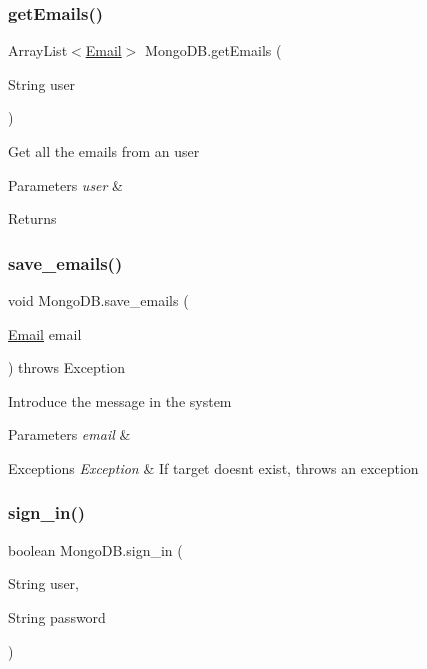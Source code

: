 \subsubsection{\texorpdfstring{get\+Emails()}{getEmails()}}
{\footnotesize\ttfamily Array\+List$<$\hyperlink{class_email}{Email}$>$ Mongo\+D\+B.\+get\+Emails (\begin{DoxyParamCaption}\item[{String}]{user }\end{DoxyParamCaption})}

Get all the emails from an user 
\begin{DoxyParams}{Parameters}
{\em user} & \\
\hline
\end{DoxyParams}
\begin{DoxyReturn}{Returns}

\end{DoxyReturn}
\mbox{\label{class_mongo_d_b_a2e376b333a71c82b5dd8e054d538e7f4}} 
\subsubsection{\texorpdfstring{save\+\_\+emails()}{save\_emails()}}
{\footnotesize\ttfamily void Mongo\+D\+B.\+save\+\_\+emails (\begin{DoxyParamCaption}\item[{\hyperlink{class_email}{Email}}]{email }\end{DoxyParamCaption}) throws Exception}

Introduce the message in the system 
\begin{DoxyParams}{Parameters}
{\em email} & \\
\hline
\end{DoxyParams}

\begin{DoxyExceptions}{Exceptions}
{\em Exception} & If target doesn\textquotesingle{}t exist, throws an exception \\
\hline
\end{DoxyExceptions}
\mbox{\label{class_mongo_d_b_a672df0039a1fcd302bd399089bb7fe28}} 
\subsubsection{\texorpdfstring{sign\+\_\+in()}{sign\_in()}}
{\footnotesize\ttfamily boolean Mongo\+D\+B.\+sign\+\_\+in (\begin{DoxyParamCaption}\item[{String}]{user,  }\item[{String}]{password }\end{DoxyParamCaption})}

